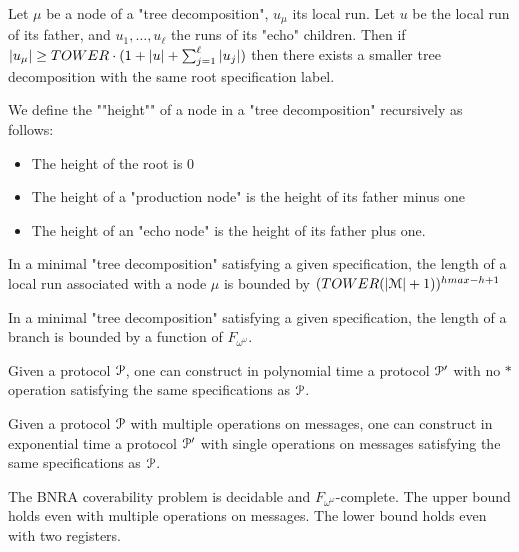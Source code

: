 \fi

\begin{lemma}
	Let $\mu$ be a node of a "tree decomposition", $u_\mu$ its local run.
	Let $u$ be the local run of its father, and $u_1, \ldots, u_\ell$ the runs of its "echo" children.
	Then if $|u_\mu| \geq TOWER \cdot (1+ |u|+ \sum_{j=1}^{\ell} |u_j|)$ then there exists a smaller tree decomposition with the same root specification label.
\end{lemma}

\begin{definition}
	We define the ""height"" of a node in a "tree decomposition" recursively as follows:
	\begin{itemize}
		\item The height of the root is $0$
		
		\item The height of a "production node" is the height of its father minus one
		
		\item The height of an "echo node" is the height of its father plus one.
	\end{itemize}
\end{definition}

\begin{lemma}
	In a minimal "tree decomposition" satisfying a given specification, the length of a local run associated with a node $\mu$ is bounded by $(TOWER (|\mathcal{M}|+1))^{hmax-h+1}$
\end{lemma}

\begin{proposition}
	In a minimal "tree decomposition" satisfying a given specification, the length of a branch is bounded by a function of $F_{\omega^\omega}$.
\end{proposition}

\begin{lemma}
	Given a protocol $\mathcal{P}$, one can construct in polynomial time a protocol $\mathcal{P}'$ with no $*$ operation satisfying the same specifications as $\mathcal{P}$.
\end{lemma}

\begin{lemma}
	Given a protocol $\mathcal{P}$ with multiple operations on messages, one can construct in exponential time a protocol $\mathcal{P}'$ with single operations on messages satisfying the same specifications as $\mathcal{P}$.
\end{lemma}

\begin{theorem}
	The BNRA coverability problem is decidable and $F_{\omega^\omega}$-complete.
	The upper bound holds even with multiple operations on messages.
	The lower bound holds even with two registers.
\end{theorem}
